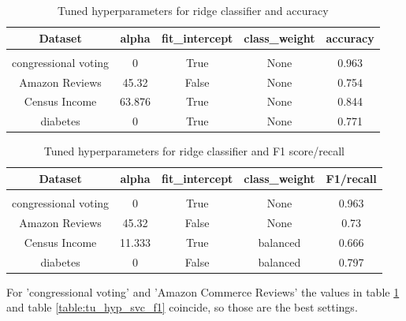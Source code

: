 \documentclass[a4paper,10pt]{article}
\begin{document}
\begin{table}[h!]
    \centering
    \begin{tabular}{|c|c|c|c|c|}
    \hline
    Dataset & \textsf{alpha} & \textsf{fit\_intercept} &  \textsf{class\_weight} &  accuracy \\
    \hline
    \multicolumn{5}{c}{\vspace{-0.4cm}} \\ %
    \hline
    congressional voting & 0 & True & None & 0.963 \\%
    \hline
    Amazon Reviews & 45.32 & False & None &  0.754 \\%
    \hline
    Census Income & 63.876 & True & None &  0.844 \\%
    \hline
    diabetes & 0 & True & None &  0.771 \\%
    \hline
    \end{tabular}
    \caption{Tuned hyperparameters for ridge classifier and accuracy} 
    \label{table:tu_hyp_ridge_ac}
    \end{table}

\begin{table}[h!]
    \centering
    \begin{tabular}{|c|c|c|c|c|}
    \hline
    Dataset & \textsf{alpha} & \textsf{fit\_intercept} &  \textsf{class\_weight} & F1/recall \\
    \hline
    \multicolumn{5}{c}{\vspace{-0.4cm}} \\ %
    \hline
    congressional voting & 0 & True & None & 0.963 \\%
    \hline
    Amazon Reviews & 45.32 & False & None &  0.73 \\%
    \hline
    Census Income & 11.333 & True & balanced & 0.666 \\%
    \hline
    diabetes & 0 & False & balanced & 0.797 \\%
    \hline
    \end{tabular}
    \caption{Tuned hyperparameters for ridge classifier and F1 score/recall} 
    \label{table:tu_hyp_ridge_f1}
    \end{table}

For 'congressional voting' and 'Amazon Commerce Reviews' the values in table \ref{table:tu_hyp_ridge_ac} and table \ref{table:tu_hyp_svc_f1} coincide, so those are the best settings. 
\end{document}
